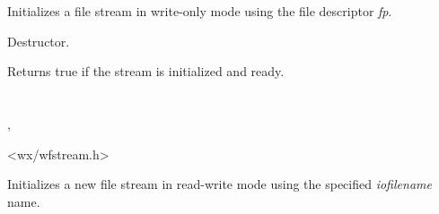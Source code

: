 Initializes a file stream in write-only mode using the file descriptor {\it fp}.

\label{wxffileoutputstreamdtor}


Destructor.

\label{wxffileoutputstreamisok}


Returns true if the stream is initialized and ready.

\section{}\label{wxffilestream}


, 


<wx/wfstream.h>




\label{wxffilestreamctor}


Initializes a new file stream in read-write mode using the specified 
{\it iofilename} name.


